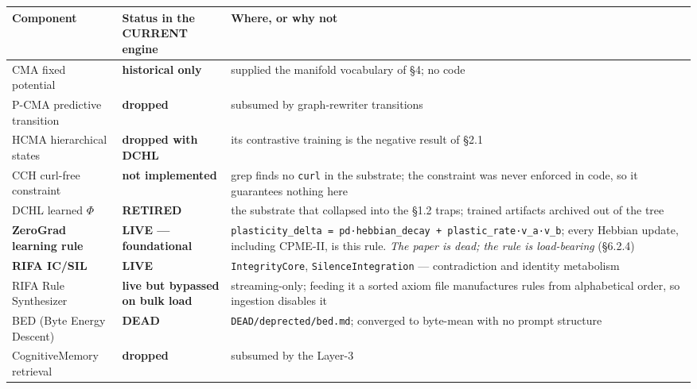 \documentclass[
  11pt,
  a4paper,
]{article}
\begin{document}
\begin{longtable}[]{@{}
  >{\raggedright\arraybackslash}p{}
  >{\raggedright\arraybackslash}p{}
  >{\raggedright\arraybackslash}p{}@{}}
\toprule\noalign{}
\begin{minipage}[b]{\linewidth}\raggedright
Component
\end{minipage} & \begin{minipage}[b]{\linewidth}\raggedright
Status in the CURRENT engine
\end{minipage} & \begin{minipage}[b]{\linewidth}\raggedright
Where, or why not
\end{minipage} \\
\midrule\noalign{}
\endhead
\bottomrule\noalign{}
\endlastfoot
CMA fixed potential & \textbf{historical only} & supplied the manifold
vocabulary of §4; no code \\
P-CMA predictive transition & \textbf{dropped} & subsumed by
graph-rewriter transitions \\
HCMA hierarchical states & \textbf{dropped with DCHL} & its contrastive
training is the negative result of §2.1 \\
CCH curl-free constraint & \textbf{not implemented} & grep finds no
\texttt{curl} in the substrate; the constraint was never enforced in
code, so it guarantees nothing here \\
DCHL learned \(\Phi\) & \textbf{RETIRED} & the substrate that collapsed
into the §1.2 traps; trained artifacts archived out of the tree \\
\textbf{ZeroGrad learning rule} & \textbf{LIVE --- foundational} &
\texttt{plasticity\_delta\ =\ pd·hebbian\_decay\ +\ plastic\_rate·v\_a·v\_b};
every Hebbian update, including CPME-II, is this rule. \emph{The paper
is dead; the rule is load-bearing} (§6.2.4) \\
\textbf{RIFA IC/SIL} & \textbf{LIVE} & \texttt{IntegrityCore},
\texttt{SilenceIntegration} --- contradiction and identity metabolism \\
RIFA Rule Synthesizer & \textbf{live but bypassed on bulk load} &
streaming-only; feeding it a sorted axiom file manufactures rules from
alphabetical order, so ingestion disables it \\
BED (Byte Energy Descent) & \textbf{DEAD} &
\texttt{DEAD/deprected/bed.md}; converged to byte-mean with no prompt
structure \\
CognitiveMemory retrieval & \textbf{dropped} & subsumed by the Layer-3

\end{longtable}
\end{document}
